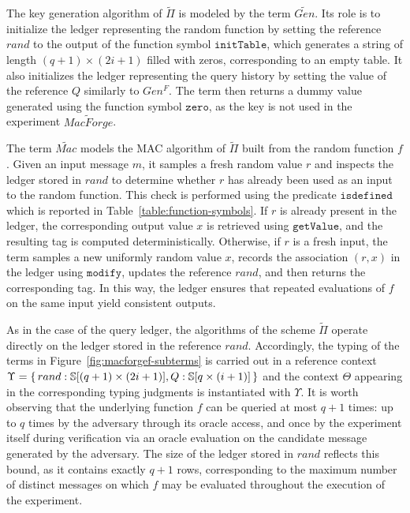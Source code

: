 The key generation algorithm of $\widetilde{\Pi}$ is modeled by the term $\widetilde{Gen}$. Its role is to initialize the ledger representing the random function by setting the reference $rand$ to the output of the function symbol $\mathtt{initTable}$, which generates a string of length $(q+1)\times(2i+1)$ filled with zeros, corresponding to an empty table. It also initializes the ledger representing the query history by setting the value of the reference $Q$ similarly to $Gen^F$. The term then returns a dummy value generated using the function symbol $\mathtt{zero}$, as the key is not used in the
experiment $\widetilde{MacForge}$.

The term $\widetilde{\mathit{Mac}}$ models the MAC algorithm of $\widetilde{\Pi}$ built from the random function $f$. Given an input message $m$, it samples a fresh random value $r$ and inspects the ledger stored in $rand$ to determine whether $r$ has already been used as an input to the random function. This check is performed using the predicate $\mathtt{isdefined}$ which is reported in Table~\ref{table:function-symbols}. If $r$ is already present in the ledger, the corresponding output value $x$ is retrieved using $\mathtt{getValue}$, and the
resulting tag is computed deterministically. Otherwise, if $r$ is a fresh input, the term samples a new uniformly random value $x$, records the association $(r,x)$ in the ledger using $\mathtt{modify}$, updates the reference $rand$, and then returns the corresponding tag. In this way, the ledger ensures that repeated evaluations of $f$ on the same input yield consistent outputs. 

As in the case of the query ledger, the algorithms of the scheme $\widetilde{\Pi}$ operate directly on the ledger stored in the reference $rand$. Accordingly, the typing of the terms in Figure~\ref{fig:macforgef-subterms} is carried out in a reference context $\Upsilon = \{\, rand : \mathbb{S}[(q+1)\times(2i+1)], Q: \mathbb{S}[q\times(i+1)] \,\}$ and the context $\Theta$ appearing in the corresponding typing judgments is instantiated with $\Upsilon$. It is worth observing that the underlying function $f$ can be queried at most $q+1$ times: up to $q$ times by the adversary through its oracle access, and once by the experiment itself during verification via an oracle evaluation on the candidate message generated by the adversary. The size of the ledger stored in $rand$ reflects this bound, as it contains exactly $q+1$ rows, corresponding to the maximum number of distinct messages on which $f$ may be evaluated throughout the execution of the experiment.

